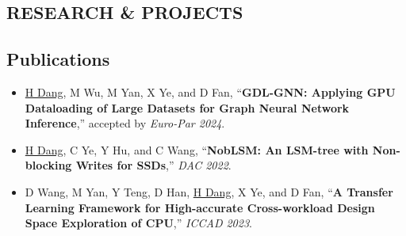 \documentclass[a4paper,10pt]{ctexart} %
\begin{document}

\begin{keepsection}
\section{RESEARCH \& PROJECTS}

\subsection{Publications}
    \begin{itemize}
        \item \underline{H Dang}, M Wu, M Yan, X Ye, and D Fan, ``\textbf{GDL-GNN: Applying GPU Dataloading of Large Datasets for Graph Neural Network Inference},'' accepted by \textit{Euro-Par 2024}.
        \item \underline{H Dang}, C Ye, Y Hu, and C Wang, ``\textbf{NobLSM: An LSM-tree with Non-blocking Writes for SSDs},'' \textit{DAC 2022}.
        \item D Wang, M Yan, Y Teng, D Han, \underline{H Dang}, X Ye, and D Fan, ``\textbf{A Transfer Learning Framework for High-accurate Cross-workload Design Space Exploration of CPU},'' \textit{ICCAD 2023}.
    \end{itemize}
\end{keepsection}
\end{document}
